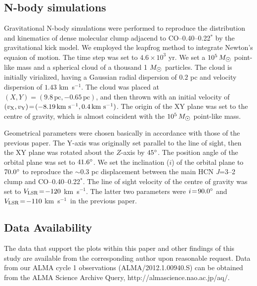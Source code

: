 \documentclass{nature}
\def\kms{\hbox{km s$^{-1}$}}
\def\VLSR{\hbox{$V_{\rm LSR}$}}
\def\sun{\hbox{$\odot$}}
\def\arcdeg{\hbox{$^\circ$}}
\begin{document}
\begin{methods}
\subsection{N-body simulations}
Gravitational N-body simulations were performed to reproduce the distribution and kinematics of dense molecular clump adjacend to CO--0.40--0.22$^*$ by the gravitational kick model. We employed the leapfrog method to integrate Newton's equaion of motion. The time step was set to $4.6\times 10^3$ yr. We set a $10^5\,M_{\sun}$ point-like mass and a spherical cloud of a thousand 1 $M_{\sun}$ particles. The cloud is initially virialized, having a Gaussian radial dispersion of $0.2$ pc and velocity dispersion of $1.43$ \kms. The cloud was placed at $(X, Y)\!=\!(9.8\,\mbox{pc}, -0.65\,\mbox{pc})$, and then thrown with an initial velocity of $(v_{\rm X}, v_{\rm Y})\!=\!(-8.19\,\kms , 0.4\,\kms)$. The origin of the XY plane was set to the centre of gravity, which is almost coincident with the $10^5\,M_{\sun}$ point-like mass.  

Geometrical parameters were chosen basically in accordance with those of the previous paper\cite{Oka16}. The Y-axis was originally set parallel to the line of sight, then the XY plane was rotated about the $Z$-axis by $45\arcdeg$. The position angle of the orbital plane was set to $41.6\arcdeg$. We set the inclination ($i$) of the orbital plane to $70.0\arcdeg$ to reproduce the $\sim\!0.3$ pc displacement between the main HCN {\it J}=3--2 clump and CO--0.40--0.22$^*$.  The line of sight velocity of the centre of gravity was set to $\VLSR\!=\!-120$ \kms . The latter two parameters were $i\!=\!90.0\arcdeg$ and $\VLSR\!=\!-110$ \kms\ in the previous paper\cite{Oka16}. 


\subsection{Data Availability}
The data that support the plots within this paper and other findings of this study are available from the corresponding author upon reasonable request. Data from our ALMA cycle 1 observations (ALMA/2012.1.00940.S) can be obtained from the ALMA Science Archive Query, http://almascience.nao.ac.jp/aq/.  

\end{methods}



\end{document}
